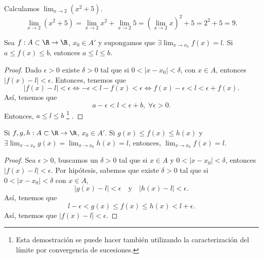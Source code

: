 \begin{eg}
\normalfont Calculamos $\displaystyle \lim_{x \to 2}\left(x^{2}+5\right) $. 
\[\lim_{x \to 2}\left(x^{2}+5\right) = \lim_{x \to 2}x^{2} + \lim_{x \to 2}5 = \left(\lim_{x \to 2}x\right)^{2} + 5 = 2^{2} + 5 = 9.\]
\end{eg}

\begin{ftheorem}[]
\normalfont Sea $\displaystyle f : A \subset \R \to \R $, $\displaystyle x_{0} \in A' $ y supongamos que $\displaystyle \exists\lim_{x \to x_{0}}f\left(x\right)=l $. Si $\displaystyle a \leq f\left(x\right) \leq b $, entonces $\displaystyle a \leq l \leq b $.
\end{ftheorem}

\begin{proof}
Dado $\displaystyle \epsilon > 0 $ existe $\displaystyle \delta > 0 $ tal que si $\displaystyle 0 < \left|x-x_{0}\right| < \delta  $, con $\displaystyle x \in A $, entonces $\displaystyle \left|f\left(x\right)-l\right| < \epsilon  $. Entonces, tenemos que 
\[ \left|f\left(x\right)-l\right| < \epsilon \iff - \epsilon < l - f\left(x\right) < \epsilon \iff f\left(x\right)-\epsilon < l < \epsilon + f\left(x\right).\]
Así, tenemos que
\[a - \epsilon < l < \epsilon + b, \; \forall \epsilon > 0 .\]
Entonces, $\displaystyle a \leq l \leq b $ \footnote{Esta demostración se puede hacer también utilizando la caracterización del límite por convergencia de sucesiones.} .
\end{proof}

\begin{ftheorem}
\normalfont Si $\displaystyle f, g, h : A\subset \R \to \R $, $\displaystyle x_{0} \in A' $. Si $\displaystyle g\left(x\right) \leq f\left(x\right) \leq h\left(x\right) $ y $\displaystyle \exists \lim_{x \to x_{0}}g\left(x\right)=\lim_{x \to x_{0}}h\left(x\right) = l $, entonces, $\displaystyle \lim_{x \to x_{0}}f\left(x\right) = l $.
\end{ftheorem}

\begin{proof}
Sea $\displaystyle \epsilon > 0 $, buscamos un $\displaystyle \delta > 0 $ tal que si $\displaystyle x \in A $ y $\displaystyle 0 < \left|x - x_{0}\right| < \delta $, entonces $\displaystyle \left|f\left(x\right)-l\right| < \epsilon  $. Por hipótesis, sabemos que existe $\displaystyle \delta > 0 $ tal que si $\displaystyle 0 < \left|x-x_{0}\right| < \delta  $ con $\displaystyle x \in A $, 
\[ \left|g\left(x\right)-l\right|< \epsilon \quad \text{y} \quad \left|h\left(x\right)-l\right|< \epsilon.\]
Así, tenemos que
\[l - \epsilon < g\left(x\right) \leq f\left(x\right) \leq h\left(x\right) < l+\epsilon .\]
Así, tenemos que $\displaystyle \left|f\left(x\right)-l\right|<\epsilon  $.
\end{proof}

